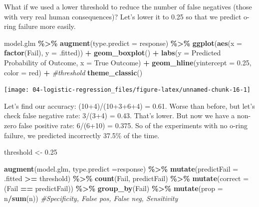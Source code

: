 \documentclass[
]{book}
\newenvironment{Shaded}{\begin{snugshade}}{\end{snugshade}}
\newcommand{\AttributeTok}[1]{\textcolor[rgb]{0.13,0.29,0.53}{#1}}
\newcommand{\CommentTok}[1]{\textcolor[rgb]{0.56,0.35,0.01}{\textit{#1}}}
\newcommand{\FloatTok}[1]{\textcolor[rgb]{0.00,0.00,0.81}{#1}}
\newcommand{\FunctionTok}[1]{\textcolor[rgb]{0.13,0.29,0.53}{\textbf{#1}}}
\newcommand{\NormalTok}[1]{#1}
\newcommand{\OtherTok}[1]{\textcolor[rgb]{0.56,0.35,0.01}{#1}}
\newcommand{\SpecialCharTok}[1]{\textcolor[rgb]{0.81,0.36,0.00}{\textbf{#1}}}
\newcommand{\StringTok}[1]{\textcolor[rgb]{0.31,0.60,0.02}{#1}}
\begin{document}
What if we used a lower threshold to reduce the number of false negatives (those with very real human consequences)? Let's lower it to 0.25 so that we predict o-ring failure more easily.

\begin{Shaded}
\begin{Highlighting}[]
\NormalTok{model.glm }\SpecialCharTok{\%\textgreater{}\%}
  \FunctionTok{augment}\NormalTok{(}\AttributeTok{type.predict =} \StringTok{\textquotesingle{}response\textquotesingle{}}\NormalTok{) }\SpecialCharTok{\%\textgreater{}\%}
  \FunctionTok{ggplot}\NormalTok{(}\FunctionTok{aes}\NormalTok{(}\AttributeTok{x =} \FunctionTok{factor}\NormalTok{(Fail), }\AttributeTok{y =}\NormalTok{ .fitted)) }\SpecialCharTok{+} 
  \FunctionTok{geom\_boxplot}\NormalTok{() }\SpecialCharTok{+}
  \FunctionTok{labs}\NormalTok{(}\AttributeTok{y =} \StringTok{\textquotesingle{}Predicted Probability of Outcome\textquotesingle{}}\NormalTok{, }\AttributeTok{x =} \StringTok{\textquotesingle{}True Outcome\textquotesingle{}}\NormalTok{) }\SpecialCharTok{+}
  \FunctionTok{geom\_hline}\NormalTok{(}\AttributeTok{yintercept =} \FloatTok{0.25}\NormalTok{, }\AttributeTok{color =} \StringTok{\textquotesingle{}red\textquotesingle{}}\NormalTok{) }\SpecialCharTok{+} \CommentTok{\#threshold}
  \FunctionTok{theme\_classic}\NormalTok{()}
\end{Highlighting}
\end{Shaded}

\begin{center}\texttt{[image: 04-logistic-regression\_files/figure-latex/unnamed-chunk-16-1]} \end{center}

Let's find our accuracy: (10+4)/(10+3+6+4) = 0.61. Worse than before, but let's check false negative rate: 3/(3+4) = 0.43. That's lower. But now we have a non-zero false positive rate: 6/(6+10) = 0.375. So of the experiments with no o-ring failure, we predicted incorrectly 37.5\% of the time.

\begin{Shaded}
\begin{Highlighting}[]
\NormalTok{threshold }\OtherTok{\textless{}{-}} \FloatTok{0.25}

\FunctionTok{augment}\NormalTok{(model.glm, }\AttributeTok{type.predict =}\StringTok{\textquotesingle{}response\textquotesingle{}}\NormalTok{) }\SpecialCharTok{\%\textgreater{}\%}
  \FunctionTok{mutate}\NormalTok{(}\AttributeTok{predictFail =}\NormalTok{ .fitted }\SpecialCharTok{\textgreater{}=}\NormalTok{ threshold) }\SpecialCharTok{\%\textgreater{}\%}
  \FunctionTok{count}\NormalTok{(Fail, predictFail) }\SpecialCharTok{\%\textgreater{}\%}
  \FunctionTok{mutate}\NormalTok{(}\AttributeTok{correct =}\NormalTok{ (Fail }\SpecialCharTok{==}\NormalTok{ predictFail)) }\SpecialCharTok{\%\textgreater{}\%}
  \FunctionTok{group\_by}\NormalTok{(Fail) }\SpecialCharTok{\%\textgreater{}\%}
  \FunctionTok{mutate}\NormalTok{(}\AttributeTok{prop =}\NormalTok{ n}\SpecialCharTok{/}\FunctionTok{sum}\NormalTok{(n)) }\CommentTok{\#Specificity, False pos, False neg, Sensitivity }
\end{Highlighting}
\end{Shaded}
\end{document}

